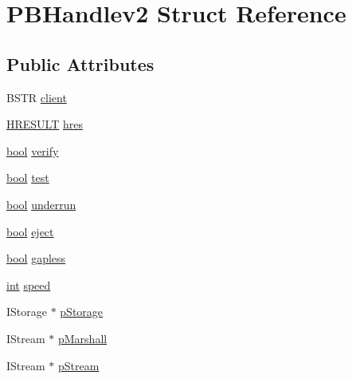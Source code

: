 \hypertarget{struct_p_b_handlev2}{}\section{P\+B\+Handlev2 Struct Reference}
\label{struct_p_b_handlev2}
\subsection*{Public Attributes}
\begin{DoxyCompactItemize}
\item 
B\+S\+TR \hyperlink{struct_p_b_handlev2_a9b8fa065de7bf55a2cb5e50dd69cb8a2}{client}
\item 
\hyperlink{px__win__ds_8c_a6ad46d30b0323d7b029e41f32f8a2571}{H\+R\+E\+S\+U\+LT} \hyperlink{struct_p_b_handlev2_a1813bf4ddcda497a7f73d29f1c5daead}{hres}
\item 
\hyperlink{mac_2config_2i386_2lib-src_2libsoxr_2soxr-config_8h_abb452686968e48b67397da5f97445f5b}{bool} \hyperlink{struct_p_b_handlev2_a0ef27b9e8f1195216ae6759dc1e1192b}{verify}
\item 
\hyperlink{mac_2config_2i386_2lib-src_2libsoxr_2soxr-config_8h_abb452686968e48b67397da5f97445f5b}{bool} \hyperlink{struct_p_b_handlev2_a93cf1a1024cab315d0e18721f42ede35}{test}
\item 
\hyperlink{mac_2config_2i386_2lib-src_2libsoxr_2soxr-config_8h_abb452686968e48b67397da5f97445f5b}{bool} \hyperlink{struct_p_b_handlev2_aa3ec21e1d20dc709aac04ce7f8079f72}{underrun}
\item 
\hyperlink{mac_2config_2i386_2lib-src_2libsoxr_2soxr-config_8h_abb452686968e48b67397da5f97445f5b}{bool} \hyperlink{struct_p_b_handlev2_a6613518255c7e19899fab520a140d4f9}{eject}
\item 
\hyperlink{mac_2config_2i386_2lib-src_2libsoxr_2soxr-config_8h_abb452686968e48b67397da5f97445f5b}{bool} \hyperlink{struct_p_b_handlev2_afcccfedecdaae5ef4936babcdc300689}{gapless}
\item 
\hyperlink{xmltok_8h_a5a0d4a5641ce434f1d23533f2b2e6653}{int} \hyperlink{struct_p_b_handlev2_a68ec755f6c9c8bf0ae0ea3657ee495bd}{speed}
\item 
I\+Storage $\ast$ \hyperlink{struct_p_b_handlev2_a1bc33e7d824c58e0bc75704185cafc03}{p\+Storage}
\item 
I\+Stream $\ast$ \hyperlink{struct_p_b_handlev2_ac1af996dd35d93cd571aa0c2a182e86e}{p\+Marshall}
\item 
I\+Stream $\ast$ \hyperlink{struct_p_b_handlev2_a80e201eb7673f6433f1cb8b028b509d8}{p\+Stream}

\end{DoxyCompactItemize}

